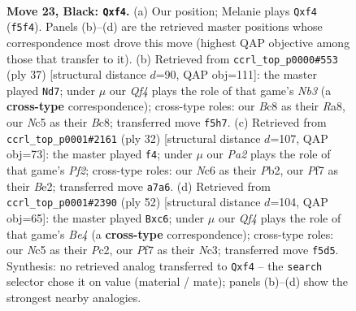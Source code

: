 \documentclass[11pt]{article}
\begin{document}
\clearpage

\begin{figure}[p]\centering
\begin{subfigure}{0.46\textwidth}\centering
\resizebox{\linewidth}{!}{%
\newchessgame
\chessboard[
  setfen={1rb1r1k1/p1p2pp1/2n4p/p1n2q1P/2P2P2/2P1P1R1/8/R1BQKBN1 b Q - 9 23},
  showmover=false,
  pgfstyle=straightmove, color=movearrow, markmove={f5-f4}
]}
\caption{}
\end{subfigure}\hfill
\begin{subfigure}{0.46\textwidth}\centering
\resizebox{\linewidth}{!}{%
\newchessgame
\chessboard[
  setfen={r1b1k2r/pp3p2/1n1p3p/q2Pp2n/P1p1P2B/2P2P2/2Q1N3/R3KB1R b KQkq - 0 19},
  showmover=false,
  pgfstyle=straightmove, color=movearrow, markmove={b6-d7}
]}
\caption{}
\end{subfigure}
\\[4pt]
\begin{subfigure}{0.46\textwidth}\centering
\resizebox{\linewidth}{!}{%
\newchessgame
\chessboard[
  setfen={1r2k2r/2qbbp1p/p2ppp1Q/8/1n2P3/1NN5/1PPRBPPP/1K5R w k - 0 17},
  showmover=false,
  pgfstyle=straightmove, color=movearrow, markmove={f2-f4}
]}
\caption{}
\end{subfigure}\hfill
\begin{subfigure}{0.46\textwidth}\centering
\resizebox{\linewidth}{!}{%
\newchessgame
\chessboard[
  setfen={5r2/Rp1bk1p1/1Ppb2r1/4ppqp/P1Q1B3/2N4P/2P2PP1/3R2K1 w - - 3 27},
  showmover=false,
  pgfstyle=straightmove, color=movearrow, markmove={e4-c6}
]}
\caption{}
\end{subfigure}
\caption{\textbf{Move 23, Black: \texttt{Qxf4}.} (a) Our position; Melanie plays \texttt{Qxf4} (\texttt{f5f4}). Panels (b)--(d) are the retrieved master positions whose correspondence most drove this move (highest QAP objective among those that transfer to it). (b) Retrieved from \texttt{ccrl\_top\_p0000\#553} (ply 37) [structural distance $d$=90, QAP obj=111]: the master played \texttt{Nd7}; under $\mu$ our \emph{Qf4} plays the role of that game's \emph{Nb3} (a \textbf{cross-type} correspondence); cross-type roles: our \emph{B}c8 as their \emph{R}a8, our \emph{N}c5 as their \emph{B}c8; transferred move \texttt{f5h7}. (c) Retrieved from \texttt{ccrl\_top\_p0001\#2161} (ply 32) [structural distance $d$=107, QAP obj=73]: the master played \texttt{f4}; under $\mu$ our \emph{Pa2} plays the role of that game's \emph{Pf2}; cross-type roles: our \emph{N}c6 as their \emph{P}b2, our \emph{P}f7 as their \emph{B}e2; transferred move \texttt{a7a6}. (d) Retrieved from \texttt{ccrl\_top\_p0001\#2390} (ply 52) [structural distance $d$=104, QAP obj=65]: the master played \texttt{Bxc6}; under $\mu$ our \emph{Qf4} plays the role of that game's \emph{Be4} (a \textbf{cross-type} correspondence); cross-type roles: our \emph{N}c5 as their \emph{P}c2, our \emph{P}f7 as their \emph{N}c3; transferred move \texttt{f5d5}. Synthesis: no retrieved analog transferred to \texttt{Qxf4} -- the \texttt{search} selector chose it on value (material / mate); panels (b)--(d) show the strongest nearby analogies.}
\label{fig:thought-m45}
\end{figure}
\end{document}
